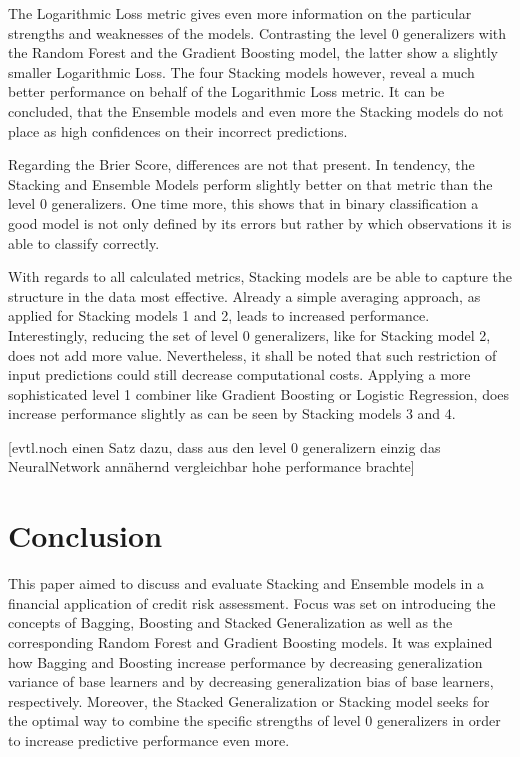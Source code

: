 \documentclass[12pt]{article}
\begin{document}
The Logarithmic Loss metric gives even more information on the particular strengths and weaknesses of the models. Contrasting the level 0 generalizers with the Random Forest and the Gradient Boosting model, the latter show a slightly smaller Logarithmic Loss. The four Stacking models however, reveal a much better performance on behalf of the Logarithmic Loss metric. It can be concluded, that the Ensemble models and even more the Stacking models do not place as high confidences on their incorrect predictions. 

Regarding the Brier Score, differences are not that present. In tendency, the Stacking and Ensemble Models perform slightly better on that metric than the level 0 generalizers. One time more, this shows that in binary classification a good model is not only defined by its errors but rather by which observations it is able to classify correctly.

With regards to all calculated metrics, Stacking models are be able to capture the structure in the data most effective. Already a simple averaging approach, as applied for Stacking models 1 and 2, leads to increased performance. Interestingly, reducing the set of level 0 generalizers, like for Stacking model 2, does not add more value. Nevertheless, it shall be noted that such restriction of input predictions could still decrease computational costs. Applying a more sophisticated level 1 combiner like Gradient Boosting or Logistic Regression, does increase performance slightly as can be seen by Stacking models 3 and 4.

[evtl.noch einen Satz dazu, dass aus den level 0 generalizern einzig das NeuralNetwork annähernd vergleichbar hohe performance brachte]








\section{Conclusion}
This paper aimed to discuss and evaluate Stacking and Ensemble models in a financial application of credit risk assessment. Focus was set on introducing the concepts of Bagging, Boosting and Stacked Generalization as well as the corresponding Random Forest and Gradient Boosting models. It was explained how Bagging and Boosting increase performance by decreasing generalization variance of base learners and by decreasing generalization bias of base learners, respectively. Moreover, the Stacked Generalization or Stacking model seeks for the optimal way to combine the specific strengths of level 0 generalizers in order to increase predictive performance even more.
\end{document}
